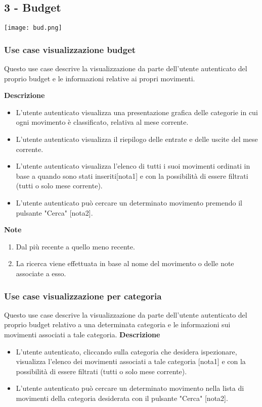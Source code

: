 \documentclass[a4paper,12pt]{article}
\begin{document}
\subsection*{3 - Budget}

\begin{center}
  \texttt{[image: bud.png]}
\end{center}

\subsubsection*{Use case visualizzazione budget}

Questo use case descrive la visualizzazione da parte dell'utente autenticato del proprio budget e le informazioni relative ai propri movimenti.

\textbf{Descrizione}
\begin{itemize} \setlength\itemsep{0.01em}
\item L'utente autenticato visualizza una presentazione grafica delle categorie in cui ogni movimento è classificato, relativa al mese corrente.
\item L'utente autenticato visualizza il riepilogo delle entrate e delle uscite del mese corrente.
\item L'utente autenticato visualizza l'elenco di tutti i suoi movimenti ordinati in base a quando sono stati inseriti[nota1] e con la possibilità di essere filtrati (tutti o solo mese corrente).
\item L'utente autenticato può cercare un determinato movimento premendo il pulsante "Cerca" [nota2].
\end{itemize}

\textbf{Note}
\begin{enumerate} \setlength\itemsep{0.01em}
\item Dal più recente a quello meno recente.
\item La ricerca viene effettuata in base al nome del movimento o delle note associate a esso.
\end{enumerate}


\subsubsection*{Use case visualizzazione per categoria}

Questo use case descrive la visualizzazione da parte dell'utente autenticato del proprio budget relativo a una determinata categoria e le informazioni sui movimenti associati a tale categoria.
\textbf{Descrizione}
\begin{itemize} \setlength\itemsep{0.01em}
\item L'utente autenticato, cliccando sulla categoria che desidera ispezionare, visualizza l'elenco dei movimenti associati a tale categoria [nota1] e con la possibilità di essere filtrati (tutti o solo mese corrente).
\item L'utente autenticato può cercare un determinato movimento nella lista di movimenti della categoria desiderata con il pulsante "Cerca" [nota2].
\end{itemize}
\end{document}
